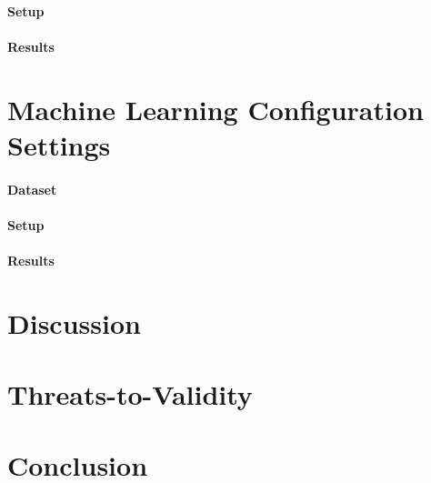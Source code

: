\documentclass[sigconf,review,anonymous]{acmart}
\begin{document}
\paragraph{Setup}
\paragraph{Results}

\section{Machine Learning Configuration Settings}\label{sec:ml_config_settings}

\paragraph{Dataset}
\paragraph{Setup}
\paragraph{Results}

\section{Discussion}\label{sec:discusssion}
\section{Threats-to-Validity}\label{sec:threats}
\section{Conclusion}\label{sec:conclusion}

\begin{acks}
\end{acks}



\end{document}
